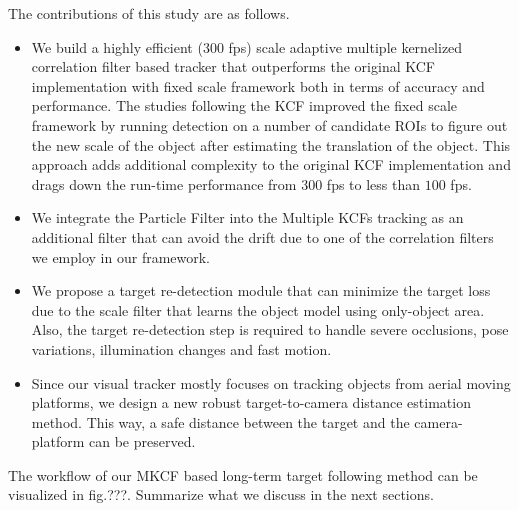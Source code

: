 \documentclass[10pt,twocolumn,letterpaper]{article}
\begin{document}
The contributions of this study are as follows.
\begin{itemize}
\item We build a highly efficient (300 fps) scale adaptive multiple kernelized correlation filter based tracker that outperforms the original KCF implementation with fixed scale framework both in terms of accuracy and performance. The studies following the KCF improved the fixed scale framework by running detection on a number of candidate ROIs to figure out the new scale of the object after estimating the translation of the object. This approach adds additional complexity to the original KCF implementation and drags down the run-time performance from $300$ fps to less than $100$ fps.
\item We integrate the Particle Filter into the Multiple KCFs tracking as an additional filter that can avoid the drift due to one of the correlation filters we employ in our framework.
\item We propose a target re-detection module that can minimize the target loss due to the scale filter that learns the object model using only-object area. Also, the target re-detection step is required to handle severe occlusions, pose variations, illumination changes and fast motion.
\item Since our visual tracker mostly focuses on tracking objects from aerial moving platforms, we design a new robust target-to-camera distance estimation method. This way, a safe distance between the target and the camera-platform can be preserved.
\end{itemize}

The workflow of our MKCF based long-term target following method can be visualized in fig.???. Summarize what we discuss in the next sections.


{\small


}
\end{document}
